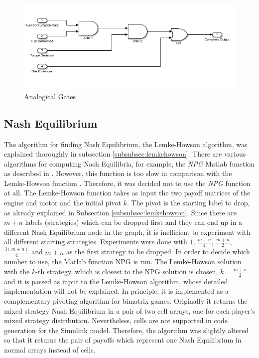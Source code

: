 \begin{figure}[h]
\centering
\includegraphics[scale=0.6]{figures/analogicalgates}
\caption{Analogical Gates}
\label{fig:analgates}
\end{figure}

\subsection{Nash Equilibrium}
The algorithm for finding Nash Equilibrium, the Lemke-Howson algorithm, was explained thoroughly in subsection \ref{subsubsec:lemkehowson}. There are various algorithms for computing Nash Equilibria, for example, the \textit{NPG} Matlab function as described in \citet{npg}. However, this function is too slow in comparison with the Lemke-Howson function \citep{lemkeHowson2014Matlab}. Therefore, it was decided not to use the \textit{NPG} function at all. The Lemke-Howson function takes as input the two payoff matrices of the engine and motor and the initial pivot $k$. The pivot is the starting label to drop, as already explained in Subsection \ref{subsubsec:lemkehowson}. Since there are $m+n$ labels (strategies) which can be dropped first and they can end up in a different Nash Equilibrium node in the graph, it is inefficient to experiment with all different starting strategies. Experiments were done with $1$, $\frac{m+n}{4}$, $\frac{m+n}{2}$, $\frac{3(m+n)}{4}$ and $m+n$ as the first strategy to be dropped. In order to decide which number to use, the Matlab function NPG is run. The Lemke-Howson solution with the $k$-th strategy, which is closest to the NPG solution is chosen, $k = \frac{m+n}{2}$ and it is passed as input to the Lemke-Howson algorithm, whose detailed implementation will not be explained. In principle, it is implemented as a complementary pivoting algorithm for bimatrix games. Originally it returns the mixed strategy Nash Equilibrium in a pair of two cell arrays, one for each player's mixed strategy distribution. Nevertheless, cells are not supported in code generation for the Simulink model. Therefore, the algorithm was slightly altered so that it returns the pair of payoffs which represent one Nash Equilibrium in normal arrays instead of cells.

